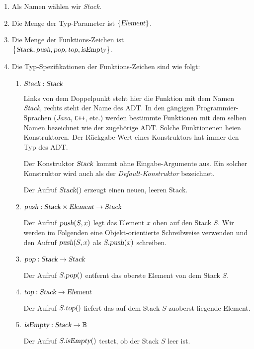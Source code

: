 \begin{enumerate}
\item Als Namen w\"ahlen wir \textsl{Stack}.
\item Die Menge der Typ-Parameter ist $\{ \textsl{Element} \}$.
\item Die Menge der Funktions-Zeichen ist \\[0.1cm]
      \hspace*{1.3cm} 
      $\bigl\{ \textsl{Stack}, \textsl{push}, \textsl{pop}, \textsl{top}, \textsl{isEmpty} \bigr\}$.
\item Die Typ-Spezifikationen der Funktions-Zeichen sind wie folgt:
      \begin{enumerate}
      \item $\textsl{Stack}: \textsl{Stack}$

            Links von dem Doppelpunkt steht hier die Funktion mit dem Namen
            \textsl{Stack}, rechts steht der Name des ADT.  In den g\"angigen
            Programmier-Sprachen (\textsl{Java}, \texttt{C++}, etc.) 
            werden bestimmte Funktionen mit dem selben Namen bezeichnet wie der zugeh\"orige
            ADT.  Solche Funktionenen hei\3en Konstruktoren.  Der R\"uckgabe-Wert eines
            Konstruktors hat immer den Typ des ADT.

            Der Konstruktor $\textsl{Stack}$ kommt ohne Eingabe-Argumente aus.  Ein
            solcher Konstruktor wird auch als der \emph{Default-Konstruktor} bezeichnet.
            
            Der Aufruf $\textsl{Stack}()$ erzeugt einen neuen, leeren Stack.
      \item $\textsl{push}: \textsl{Stack} \times \textsl{Element} \rightarrow \textsl{Stack}$

            Der Aufruf $\textsl{push}(S,x)$ legt das Element $x$ oben auf den Stack $S$.
            Wir werden im Folgenden eine Objekt-orientierte Schreibweise verwenden und
            den Aufruf  $\textsl{push}(S,x)$ als $S.\textsl{push}(x)$ schreiben.
      \item $\textsl{pop}: \textsl{Stack}  \rightarrow \textsl{Stack}$

            Der Aufruf $S.\textsl{pop}()$ entfernt das oberste Element von dem Stack $S$.
      \item $\textsl{top}: \textsl{Stack} \rightarrow \textsl{Element}$

            Der Aufruf $S.\textsl{top}()$ liefert das auf dem Stack $S$ zuoberst liegende Element. 
      \item $\textsl{isEmpty}: \textsl{Stack} \rightarrow \mathbb{B}$

            Der Aufruf $S.\textsl{isEmpty}()$ testet, ob der Stack $S$ leer ist.
      \end{enumerate}
\end{enumerate}
